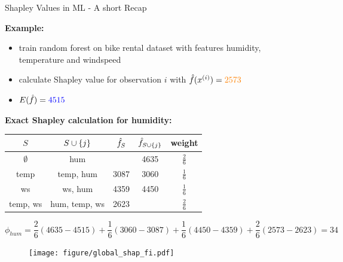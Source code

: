 \documentclass[11pt,compress,t,notes=noshow, aspectratio=169, xcolor=table]{beamer}
\begin{document}
\begin{vbframe}{Shapley Values in ML - A short Recap}
  
  \textbf{Example:} 
  \begin{itemize}
      \item train random forest on bike rental dataset with features humidity, temperature and windspeed
      \item calculate Shapley value for observation $i$ with $\fh(x^{(i)}) = \color{orange}{2573}$
      \item $E(\fh) = \color{blue}{4515}$
  \end{itemize}
  \textbf{Exact Shapley calculation for humidity:} 
  \begin{table}[T]
      \centering
      \begin{tabular}{c|c|c|c|c}
   $S$    &  $\Scupj$  & $\fh_S$ &  $\fh_{\Scupj}$  & weight\\\hline
     $\emptyset$&    hum  & \color{blue}{4515} & 4635 & $\frac{2}{6}$\\
       temp &  temp, hum & 3087 & 3060& $\frac{1}{6}$\\
       ws &  ws, hum & 4359  & 4450 & $\frac{1}{6}$\\
       temp, ws &  hum, temp, ws & 2623 & \color{orange}{2573} & $\frac{2}{6}$
         
      \end{tabular}
      \label{tab:my_label}
  \end{table}

$$
\phi_{hum} = \frac{2}{6} (4635-4515) + \frac{1}{6} (3060-3087) + \frac{1}{6} (4450-4359) + \frac{2}{6} (2573-2623) = 34
$$

\end{vbframe}


\begin{vbframe}
\begin{figure}
    \centering
    \texttt{[image: figure/global\_shap\_fi.pdf]}
\end{figure}

\end{vbframe}
\end{document}
